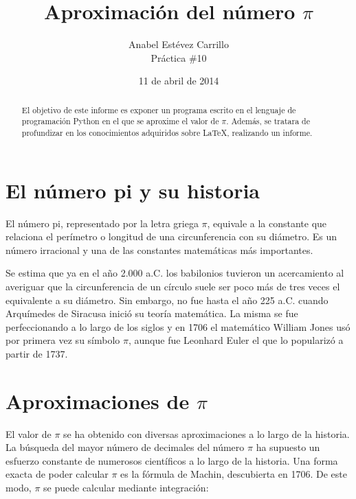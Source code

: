 \documentclass[spanish,a4paper,11pt]{article}
\begin{document}
\title{Aproximación del número $\pi$}
\author{Anabel Estévez Carrillo \\ Práctica \#10}
\date{11 de abril de 2014}

\maketitle

\begin{abstract}
El objetivo de este informe es exponer un programa escrito en el lenguaje de programación Python en el que se aproxime 
el valor de $\pi$. Además, se tratara de profundizar en los conocimientos adquiridos sobre \LaTeX{}, realizando un informe.
\end{abstract}


\section{El número pi y su historia}

El número pi, representado por la letra griega $\pi$, equivale a la constante que relaciona el perímetro o longitud de una 
circunferencia con su diámetro. Es un número irracional y una de las constantes matemáticas más importantes.

Se estima que ya en el año 2.000 a.C. los babilonios tuvieron un acercamiento al averiguar que la circunferencia de un 
círculo suele ser poco más de tres veces el equivalente a su diámetro. Sin embargo, no fue hasta el año 225 a.C. cuando 
Arquímedes de Siracusa inició su teoría matemática. La misma se fue perfeccionando a lo largo de los siglos y en 
1706 el matemático William Jones usó por primera vez su símbolo $\pi$, aunque fue Leonhard Euler el que lo popularizó
 a partir de 1737. 


\section{Aproximaciones de $\pi$}

El valor de $\pi$ se ha obtenido con diversas aproximaciones a lo largo de la historia. La búsqueda del mayor número de 
decimales del número $\pi$ ha supuesto un esfuerzo constante de numerosos científicos a lo largo de la historia.
Una forma exacta de poder calcular $\pi$ es la fórmula de Machin, descubierta en 1706. De este modo, 
$\pi$ se puede calcular mediante integración:
\end{document}
